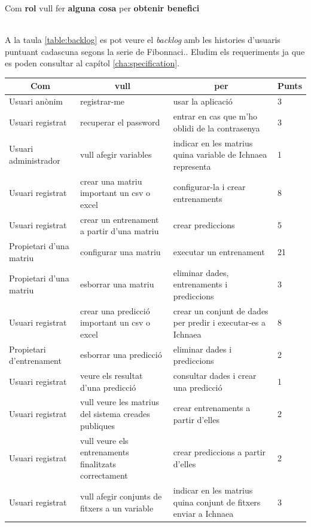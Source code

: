 \centerline{Com \textbf{rol} vull fer \textbf{alguna cosa} per \textbf{obtenir benefici}}
~\\
A la taula \ref{table:backlog} es pot veure el \textit{backlog} amb les histories d'usuaris puntuant cadascuna segons la serie de Fibonnaci.\cite{backlogfibonnacci}. Eludim els requeriments ja que es poden consultar al capítol \ref{cha:specification}.

\begin{center}
\begin{longtable}{ | p{3cm} | p{5cm} | p{5cm} | p{1cm} | }
\hline
\multicolumn{1}{|c|}{\textbf{Com}} & \multicolumn{1}{|c|}{\textbf{vull}} & \multicolumn{1}{|c|}{\textbf{per}} &\multicolumn{1}{|c|}{\textbf{Punts}} \\ \hline
Usuari anònim &	registrar-me &	usar la aplicació &	3 \\ \hline
Usuari registrat &	recuperar el password & entrar en cas que m'ho oblidi de la contrasenya & 3 \\ \hline
Usuari administrador &	vull afegir variables & indicar en les matrius quina variable de Ichnaea representa & 1 \\ \hline
Usuari registrat &	crear una matriu important un csv o excel & configurar-la i crear entrenaments & 8 \\ \hline
Usuari registrat &	crear un entrenament a partir d'una matriu & crear prediccions & 5 \\ \hline
Propietari d'una matriu & configurar una matriu & executar un entrenament & 21 \\ \hline
Propietari d'una matriu	& esborrar una matriu & eliminar dades, entrenaments i prediccions & 3 \\ \hline
Usuari registrat &	crear una predicció important un csv o excel & crear un conjunt de dades per predir i executar-es a Ichnaea & 8 \\ \hline
Propietari d'entrenament & 	esborrar una predicció & eliminar dades i prediccions & 2 \\ \hline
Usuari registrat & veure els resultat d'una predicció & consultar dades i crear una predicció & 1 \\ \hline
Usuari registrat & vull veure les matrius del sistema creades publiques & crear entrenaments a partir d'elles & 2  \\ \hline
Usuari registrat & vull veure els entrenaments finalitzats correctament	 & crear prediccions a partir d'elles & 2  \\ \hline
Usuari registrat & vull afegir conjunts de fitxers a un variable & indicar en les matrius quina conjunt de fitxers enviar a Ichnaea & 3  \\ \hline

\end{longtable}
\end{center}

